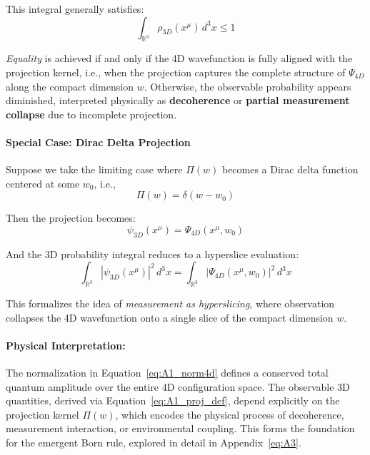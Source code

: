 \documentclass[12pt]{article}
\begin{document}
This integral generally satisfies:
\begin{equation}
\int_{\mathbb{R}^3} \rho_{3D}(x^\mu)\, d^3x \leq 1
\label{eq:A1_less_equal}
\end{equation}

\emph{Equality} is achieved if and only if the 4D wavefunction is fully aligned with the projection kernel, i.e., when the projection captures the complete structure of \(\Psi_{4D}\) along the compact dimension \(w\). Otherwise, the observable probability appears diminished, interpreted physically as \textbf{decoherence} or \textbf{partial measurement collapse} due to incomplete projection.

\vspace{1em}
\noindent
\paragraph{Special Case: Dirac Delta Projection}

Suppose we take the limiting case where \(\Pi(w)\) becomes a Dirac delta function centered at some \(w_0\), i.e.,
\begin{equation}
\Pi(w) = \delta(w - w_0)
\label{eq:A1_delta_proj}
\end{equation}

Then the projection becomes:
\begin{equation}
\psi_{3D}(x^\mu) = \Psi_{4D}(x^\mu, w_0)
\label{eq:A1_psi_special}
\end{equation}

And the 3D probability integral reduces to a hyperslice evaluation:
\begin{equation}
\int_{\mathbb{R}^3} |\psi_{3D}(x^\mu)|^2 \, d^3x = \int_{\mathbb{R}^3} \left| \Psi_{4D}(x^\mu, w_0) \right|^2 \, d^3x
\label{eq:A1_slice}
\end{equation}

This formalizes the idea of \emph{measurement as hyperslicing}, where observation collapses the 4D wavefunction onto a single slice of the compact dimension \(w\).

\vspace{1em}
\noindent
\paragraph{Physical Interpretation:}

The normalization in Equation~\eqref{eq:A1_norm4d} defines a conserved total quantum amplitude over the entire 4D configuration space. The observable 3D quantities, derived via Equation~\eqref{eq:A1_proj_def}, depend explicitly on the projection kernel \(\Pi(w)\), which encodes the physical process of decoherence, measurement interaction, or environmental coupling. This forms the foundation for the emergent Born rule, explored in detail in Appendix~\ref{eq:A3}.
\end{document}
